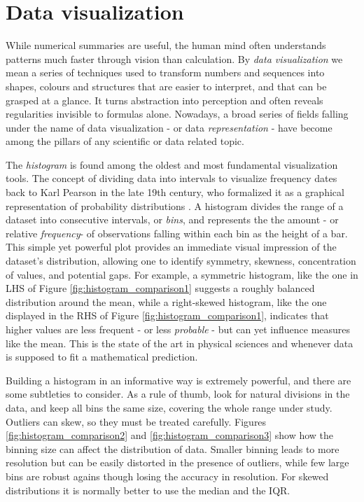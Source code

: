 \documentclass{book}
\begin{document}
\section{Data visualization}

While numerical summaries are useful, the human mind often understands patterns much faster through vision than calculation. By \textit{data visualization} we mean a series of techniques used to transform numbers and sequences into shapes, colours and structures that are easier to interpret, and that can be grasped at a glance. It turns abstraction into perception and often reveals regularities invisible to formulas alone. Nowadays, a broad series of fields falling under the name of data visualization - or data \textit{representation} - have become among the pillars of any scientific or data related topic.

\medskip

The \textit{histogram} is found among the oldest and most fundamental visualization tools. The concept of dividing data into intervals to visualize frequency dates back to Karl Pearson in the late 19th century, who formalized it as a graphical representation of probability distributions \cite{pearson1892}. A histogram divides the range of a dataset into consecutive intervals, or \textit{bins}, and represents the the amount - or relative \textit{frequency}- of observations falling within each bin as the height of a bar. This simple yet powerful plot provides an immediate visual impression of the dataset’s distribution, allowing one to identify symmetry, skewness, concentration of values, and potential gaps. For example, a symmetric histogram, like the one in LHS of Figure \ref{fig:histogram_comparison1} suggests a roughly balanced distribution around the mean, while a right-skewed histogram, like the one displayed in the RHS of Figure \ref{fig:histogram_comparison1}, indicates that higher values are less frequent - or less \textit{probable} - but can yet influence measures like the mean. This is the state of the art in physical sciences and whenever data is supposed to fit a mathematical prediction. 

\medskip

Building a histogram in an informative way is extremely powerful, and there are some subtleties to consider. As a rule of thumb, look for natural divisions in the data, and keep all bins the same size, covering the whole range under study. Outliers can skew, so they must be treated carefully. Figures \ref{fig:histogram_comparison2} and \ref{fig:histogram_comparison3} show how the binning size can affect the distribution of data. Smaller binning leads to more resolution but can be easily distorted in the presence of outliers, while few large bins are robust agains though losing the accuracy in resolution. For skewed distributions it is normally better to use the median and the IQR.
\end{document}

